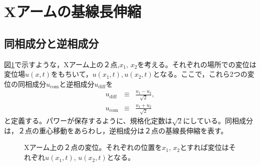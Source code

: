 
\section{Xアームの基線長伸縮}



\subsection{同相成分と逆相成分}
図\ref{img:img_diffcomm}で示すような，Xアーム上の２点,$x_1,\,x_2$を考える。それぞれの場所での変位は変位場$u(x,t)$をもちいて，$u(x_1,t),u(x_2,t)$となる。ここで，これら2つの変位の同相成分$u_{\mathrm{com}}$と逆相成分$u_\mathrm{diff}$を
\begin{eqnarray}\label{eq:eq22}
  u_{\mathrm{diff}} &\equiv& \frac{u_{1}-u_{2}}{\sqrt{2}}, \\
  u_{\mathrm{com}}  &\equiv& \frac{u_{1}+u_{2}}{\sqrt{2}}
\end{eqnarray}
と定義する。パワーが保存するように、規格化定数は$\sqrt{2}$にしている。同相成分は，２点の重心移動をあらわし，逆相成分は２点の基線長伸縮を表す。


\begin{figure}[H]
  \begin{center}
  \end{center}
  \caption{Xアーム上の２点の変位。それぞれの位置を$x_1,\,x_2$とすれば変位はそれぞれ$u(x_1,t),\,u(x_2,t)$となる。}\label{img:img_diffcomm}
\end{figure}


